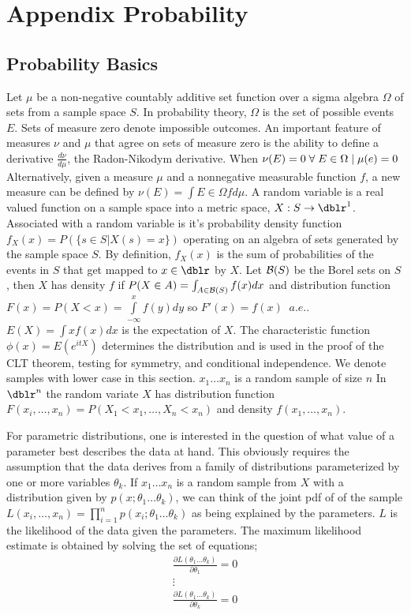 \chapter{Appendix Probability}

\section{Probability Basics}
Let $\mu$ be a non-negative countably additive set function over a sigma algebra $\Omega$ of sets from a sample space $S$. In probability theory, $\Omega$ is the set of possible events $E$. Sets of measure zero denote impossible outcomes. An important feature of measures $\nu$ and $\mu$ that agree on sets of measure zero is the ability to define a derivative $\frac{d \nu}{d \mu}$, the Radon-Nikodym derivative.  When $\nu (E)=0 \; \forall \; E \in \Omega \;| \; \mu(e)=0$  Alternatively, given a measure $\mu$ and a nonnegative measurable function $f$, a new measure can be defined by $ \nu(E) = \int\limits{E \in \Omega}{} f d \mu$. A random variable is a real valued function on a sample space into a metric space, $X : S \rightarrow \dblr^{1} $. Associated with a random variable is it's probability density function $f_{X}(x)=P(\{s \in S | X(s) = x\})$ operating on an algebra of sets generated by the sample space $S$. By definition, $f_{X}(x)$ is the sum of probabilities of the events in $S$ that get mapped to $x \in \dblr$ by $X$.  Let $\mathcal{B}(S)$ be the Borel sets on $S$, then $X$ has density $f$ if $P(X \in A) = \int_{A \in \mathcal{B}(S)} f(x) dx $ and distribution function $F(x) = P(X<x)=\int\limits_{-\infty}^x f(y) dy$ so $F'(x)=f(x) \;\; a.e.$.  $E(X)=\int x f(x) dx$ is the expectation of $X$.  The characteristic function $\phi(x) = E(e^{itX} )$ determines the distribution and is used in the proof of the CLT theorem, testing for symmetry, and conditional independence.  We denote samples with lower case in this section.  $x_1 \ldots x_n$ is a random sample of size $n$  In $\dblr^n$ the random variate $X$ has distribution function $F(x_i, \ldots , x_n) = P(X_1<x_1, \ldots , X_n<x_n )$ and density $f(x_1, \ldots , x_n )$.

For parametric distributions, one is interested in the question of what value of a parameter best describes the data at hand.  This obviously requires the assumption that the data derives from a family of distributions parameterized by one or more variables $\theta_k$.  If $x_1 \ldots x_n$ is a random sample from $X$ with a distribution given by $p(x;\theta_1 \ldots \theta_k)$, we can think of the joint pdf of of the sample $L(x_i, \ldots,x_n) = \prod\limits_{i=1}^{n} p(x_i;\theta_1 \ldots \theta_k)$ as being explained by the parameters.  $L$ is the likelihood of the data given the parameters.  The maximum likelihood estimate is obtained by solving the set of equations;
\begin{eqnarray} \nonumber
  \frac{\partial L(\theta_1 \ldots \theta_k)}{\partial
  \theta_1}=0 \\ \nonumber
  \vdots \\ \nonumber
   \frac{\partial L(\theta_1 \ldots \theta_k)}{\partial
   \theta_k}=0 \\ \nonumber
\end{eqnarray}

